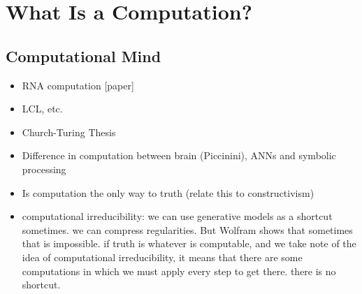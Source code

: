 

\section{What Is a Computation?}

\subsection{Computational Mind}
\begin{itemize}
    \item RNA computation [paper]
    \item LCL, etc.
    \item Church-Turing Thesis
    \item Difference in computation between brain (Piccinini), ANNs and symbolic processing
    \item Is computation the only way to truth (relate this to constructivism)
    \item computational irreducibility: we can use generative models as a shortcut sometimes. we can compress regularities. But Wolfram shows that sometimes that is impossible. if truth is whatever is computable, and we take note of the idea of computational irreducibility, it means that there are some computations in which we must apply every step to get there. there is no shortcut. 
\end{itemize}




